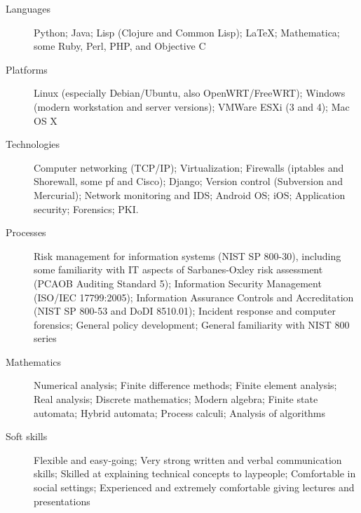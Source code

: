 \documentclass{resume}
\begin{document}
\begin{description}
\item[Languages]
Python; Java; Lisp (Clojure and Common Lisp); \LaTeX; Mathematica; some Ruby, Perl, PHP, and Objective C
\item[Platforms]
Linux (especially Debian/Ubuntu, also OpenWRT/FreeWRT);
Windows (modern workstation and server versions);
VMWare ESXi (3 and 4); Mac OS X
\item[Technologies]
Computer networking (TCP/IP); Virtualization; Firewalls (iptables and Shorewall,
some pf and Cisco); Django; Version control (Subversion and Mercurial);
Network monitoring and IDS; Android OS; iOS; Application
security; Forensics; PKI.
\item[Processes]
Risk management for information systems (NIST SP 800-30),
including some familiarity with IT aspects of Sarbanes-Oxley risk assessment
(PCAOB Auditing Standard 5); Information Security Management (ISO/IEC 17799:2005);
Information Assurance Controls and Accreditation (NIST SP 800-53 and DoDI 8510.01);
Incident response and computer forensics; General policy development;
General familiarity with NIST 800 series
\item[Mathematics]
Numerical analysis; Finite difference methods; Finite element analysis;
Real analysis; Discrete mathematics; Modern algebra; Finite state automata;
Hybrid automata; Process calculi; Analysis of algorithms
\item[Soft skills]
Flexible and easy-going; Very strong written and verbal communication skills;
Skilled at explaining technical concepts to laypeople;
Comfortable in social settings; Experienced and extremely comfortable giving
lectures and presentations
\end{description}
\end{document}
